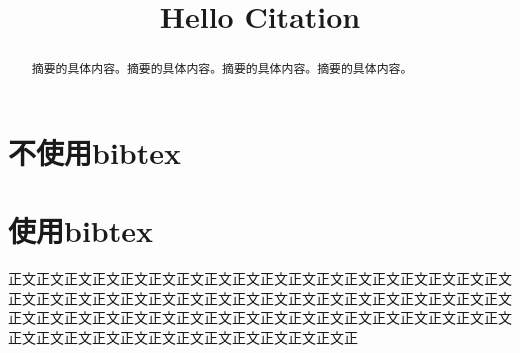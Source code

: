 \documentclass[withoutpreface,bwprint]{cumcmthesis}
\title{Hello Citation}
\begin{document}
	\maketitle
	\begin{abstract}
		摘要的具体内容。摘要的具体内容。摘要的具体内容。摘要的具体内容。
	\end{abstract}
	
	
	\section{不使用bibtex}
	
	
	
	
	
	\section{使用bibtex}
	
			正文正文正文正文正文正文正文正文正文正文正文正文正文正文正文正文正文正文正文正文正\cite{2022gsnn}文正文正文正文正文正文正文正文正文正文正文正文正文正文正文正文正文正文正文正文正文正文正文正文正文正文正文正文正文正文\cite{bbb}正文正文正文正文正文正文正文正文正文正文正文正文正文\cite{zxg}正文正文\cite{dsf}正文正
		
	\newpage
	
%		
%		
%		
%		
%		
\end{document}
